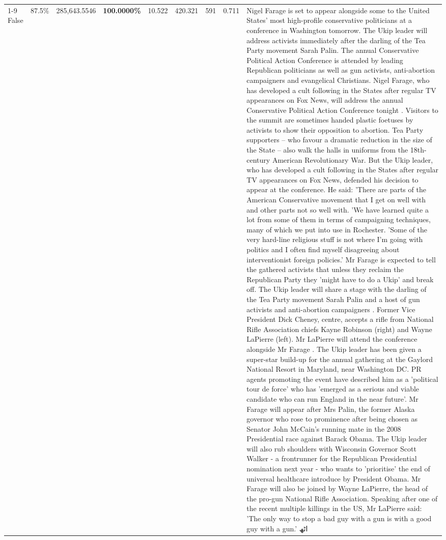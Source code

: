 \begin{table}[H]
\begin{tabular}{lllrlllll}
\cline{1-9}
False & 87.5\% & \color{red} 285,643.5546 & \bfseries \color{red} 100.0000\% & 10.522 & 420.321 & 591 & 0.711 & Nigel Farage is set to appear alongside some to the United States' most high-profile conservative politicians at a conference in Washington tomorrow. The Ukip leader will address activists immediately after the darling of the Tea Party movement Sarah Palin. The annual Conservative Political Action Conference is attended by leading Republican politicians as well as gun activists, anti-abortion campaigners and evangelical Christians. Nigel Farage, who has developed a cult following in the States after regular TV appearances on Fox News, will address the annual Conservative Political Action Conference tonight . Visitors to the summit are sometimes handed plastic foetuses by activists to show their opposition to abortion. Tea Party supporters – who favour a dramatic reduction in the size of the State – also walk the halls in uniforms from the 18th-century American Revolutionary War. But the Ukip leader, who has developed a cult following in the States after regular TV appearances on Fox News, defended his decision to appear at the conference. He said: 'There are parts of the American Conservative movement that I get on well with and other parts not so well with. 'We have learned quite a lot from some of them in terms of campaigning techniques, many of which we put into use in Rochester. 'Some of the very hard-line religious stuff is not where I'm going with politics and I often find myself disagreeing about interventionist foreign policies.' Mr Farage is expected to tell the gathered activists that unless they reclaim the Republican Party they 'might have to do a Ukip' and break off. The Ukip leader will share a stage with the darling of the Tea Party movement Sarah Palin and a host of gun activists and anti-abortion campaigners . Former Vice President Dick Cheney, centre, accepts a rifle from National Rifle Association chiefs Kayne Robinson (right) and Wayne LaPierre (left). Mr LaPierre will attend the conference alongside Mr Farage . The Ukip leader has been given a super-star build-up for the annual gathering at the Gaylord National Resort in Maryland, near Washington DC. PR agents promoting the event have described him as a 'political tour de force' who has 'emerged as a serious and viable candidate who can run England in the near future'. Mr Farage will appear after Mrs Palin, the former Alaska governor who rose to prominence after being chosen as Senator John McCain's running mate in the 2008 Presidential race against Barack Obama. The Ukip leader will also rub shoulders with Wisconsin Governor Scott Walker - a frontrunner for the Republican Presidential nomination next year - who wants to 'prioritise' the end of universal healthcare introduce by President Obama. Mr Farage will also be joined by Wayne LaPierre, the head of the pro-gun National Rifle Association. Speaking after one of the recent multiple killings in the US, Mr LaPierre said: 'The only way to stop a bad guy with a gun is with a good guy with a gun.' اٹھ \\

\end{tabular}
\end{table}
